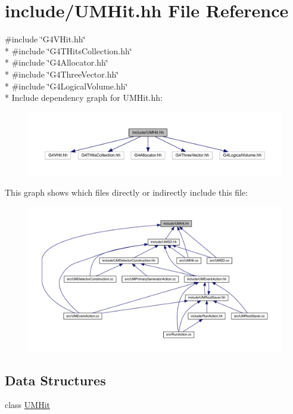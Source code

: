 \hypertarget{UMHit_8hh}{}\section{include/\+U\+M\+Hit.hh File Reference}
\label{UMHit_8hh}
{\ttfamily \#include \char`\"{}G4\+V\+Hit.\+hh\char`\"{}}\\*
{\ttfamily \#include \char`\"{}G4\+T\+Hits\+Collection.\+hh\char`\"{}}\\*
{\ttfamily \#include \char`\"{}G4\+Allocator.\+hh\char`\"{}}\\*
{\ttfamily \#include \char`\"{}G4\+Three\+Vector.\+hh\char`\"{}}\\*
{\ttfamily \#include \char`\"{}G4\+Logical\+Volume.\+hh\char`\"{}}\\*
Include dependency graph for U\+M\+Hit.\+hh\+:
\nopagebreak
\begin{figure}[H]
\begin{center}
\leavevmode
\includegraphics[width=350pt]{UMHit_8hh__incl}
\end{center}
\end{figure}
This graph shows which files directly or indirectly include this file\+:
\nopagebreak
\begin{figure}[H]
\begin{center}
\leavevmode
\includegraphics[width=350pt]{UMHit_8hh__dep__incl}
\end{center}
\end{figure}
\subsection*{Data Structures}
\begin{DoxyCompactItemize}
\item 
class \hyperlink{classUMHit}{U\+M\+Hit}
\end{DoxyCompactItemize}
